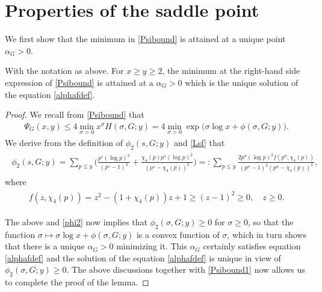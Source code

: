\documentclass[twoside,leqno,10pt, A4]{amsart}
\begin{document}
\section{Properties of the saddle point}
\label{Sec: smooth}

    
We first show that the minimum in \eqref{Psibound} is attained at a unique point $\alpha_G>0$. 
\begin{lemma}
\label{lemalphafunique}
 With the notation as above. For $x \geq y \geq 2$, the minimum at the right-hand side expression of \eqref{Psibound} is attained at a $\alpha_G>0$ which is the unique solution of the equation \eqref{alphafdef}.  
\end{lemma}
\begin{proof}
  We recall from  \eqref{Psibound} that
\begin{align}
\label{Psibound1}
  \Psi_G(x,y) \leq 4\min_{\sigma>0}x^{\sigma} H(\sigma,G; y)=4\min_{\sigma>0} \exp \big(\sigma \log x+\phi(\sigma,G; y)\big ).
\end{align}
  We derive from the definition of $\phi_2(s,G;y)$ and \eqref{Lsf} that
\begin{align}
\label{phi2}
\begin{split}
  \phi_2(s,G;y)=\sum_{p \leq y}\Big(\frac {p^s(\log p)^2}{(p^s-1)^2}+\frac {\chi_4(p)p^s(\log p)^2}{(p^s-\chi_4(p))^2}\Big )=: \sum_{p \leq y}\frac {2p^{\sigma}(\log p)^2f(p^{\sigma}, \chi_4(p))}{(p^{\sigma}-1)^2(p^{\sigma}-\chi_4(p))^2},
\end{split}
\end{align}   
  where 
\begin{align*}
\begin{split}
 f(z, \chi_4(p))=z^2-(1+\chi_4(p))z+1 \geq (z-1)^2 \geq 0, \quad z \geq 0. 
\end{split}
\end{align*}    
      
  The above and \eqref{phi2} now implies that $\phi_2(\sigma,G;y) \geq 0$ for $\sigma \geq 0$, so that the function $\sigma \mapsto \sigma \log x+\phi(\sigma,G; y)$ is a convex function of $\sigma$, which in turn shows that there is a unique $\alpha_G>0$ minimizing it. This $\alpha_G$ certainly satisfies equation \eqref{alphafdef} and the solution of the equation \eqref{alphafdef} is unique in view of $\phi_2(\sigma,G;y) \geq 0$. The above discussions together with \eqref{Psibound1} now allows us to complete the proof of the lemma. 
\end{proof}
 
\end{document}
